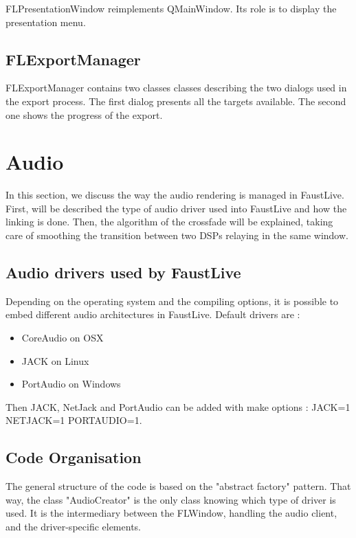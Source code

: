 \documentclass[a4paper]{article}
\begin{document}
{FLPresentationWindow reimplements QMainWindow. Its role is to display the presentation menu.

\subsection{FLExportManager}

FLExportManager contains two classes classes describing the two dialogs used in the export process. The first dialog presents all the targets available. The second one shows the progress of the export.

\section{Audio \label{Audio}}

In this section, we discuss the way the audio rendering is managed in FaustLive. 
First, will be described the type of audio driver used into FaustLive and how the linking is done. Then, the algorithm of the crossfade will be explained, taking care of smoothing the transition between two DSPs relaying in the same window. 

\subsection{Audio drivers used by FaustLive}
 
Depending on the operating system and the compiling options, it is possible to embed different audio architectures in FaustLive.
Default drivers are :
\begin{itemize}
\item CoreAudio on OSX
\item JACK on Linux
\item PortAudio on Windows
\end{itemize}

Then JACK, NetJack and PortAudio can be added with make options : JACK=1 NETJACK=1 PORTAUDIO=1.

\subsection{Code Organisation}

The general structure of the code is based on the "abstract factory" pattern. That way, the class "AudioCreator" is the only class knowing which type of driver is used. It is the intermediary between the FLWindow, handling the audio client, and the driver-specific elements.  \\

}
\end{document}
